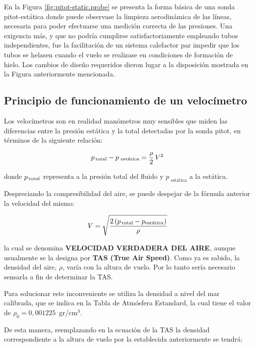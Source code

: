 \documentclass[a4paper,12pt,twoside]{article}
\begin{document}
En la Figura \ref{fig:pitot-static.probe} se presenta la forma básica de una sonda pitot-estática donde puede observase la limpieza aerodinámica de las líneas, necesaria para poder efectuarse una medición correcta de las presiones. Una exigencia más, y que no podría cumplirse satisfactoriamente empleando tubos independientes, fue la facilitación de un sistema calefactor par impedir que los tubos se helasen cuando el vuelo se realizase en condiciones de formación de hielo. Los cambios de diseño requeridos dieron lugar a la disposición mostrada en la Figura anteriormente mencionada.

\subsection{Principio de funcionamiento de un veloc\'imetro}
\label{sec:velocimetro.princio.de.funcionamiento}

Los velocímetros son en realidad manómetros muy sensibles que miden las diferencias entre la presión estática y la total detectadas por la sonda pitot, en términos de la siguiente relación:

\begin{equation*}
	p_{\text{\,total}}   - p_{\text{ est\'atica}} = \displaystyle \frac{\rho}{2} \, V^2
\end{equation*}

donde $p_{\text{\,total}} $ representa a la presión total del fluido 
y $p_{\text{ est\'atica}}$ a la estática. 

Despreciando la compresibilidad del aire, se puede despejar de la fórmula anterior la velocidad del mismo:

\begin{equation*}
  \displaystyle
	V = \sqrt{\frac{2 \left(p_{\text{\,total}} -p_{\text{est\'atica}} \right)}{\rho}}
\end{equation*}

la cual se denomina {\bf VELOCIDAD VERDADERA DEL AIRE}, aunque usualmente se la designa por 
{\bf TAS (True Air Speed)}. Como ya es sabido, la densidad del aire, 
$\rho$, varía con la altura de vuelo. 
Por lo tanto sería  necesario sensarla a fin de determinar la TAS.

Para solucionar este inconveniente se utiliza la densidad a nivel del mar calibrada, que se indica en la Tabla de Atmósfera Estandard, la cual tiene el valor de $\rho_0 = 0,001225$\, gr/cm$^3$.

De esta manera, reemplazando en la ecuación de la TAS la densidad correspondiente a la altura de vuelo por la establecida anteriormente se tendrá:
\end{document}
